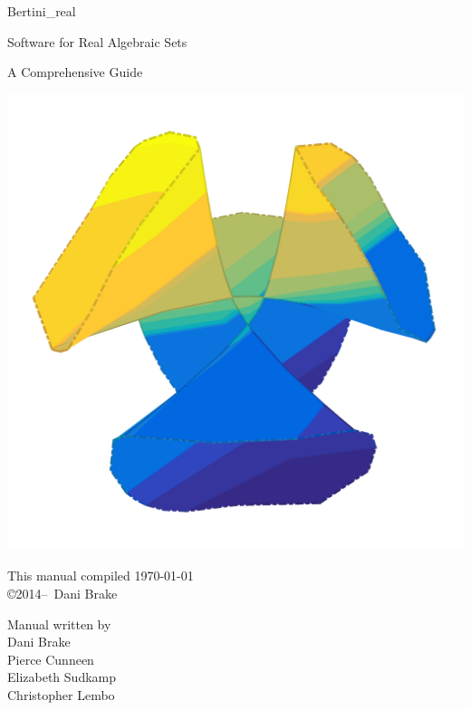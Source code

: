 \documentclass[10pt]{article}
\begin{document}
\pagestyle{plain} 

	\setcounter{page}{1}


\begin{titlepage}

	\begin{center}
	\vspace{2cm}
	{\Large Bertini\_real}

\vspace{\baselineskip}
	{\large Software for Real Algebraic Sets}



	{\large A Comprehensive Guide}	

	\vspace{3cm}
	\includegraphics[width=0.75\linewidth]{CayleyCubic}
	\end{center}

	\vfill

	\begin{minipage}{\linewidth}

	\begin{minipage}{0.4\linewidth}
	\centering
	This manual compiled \today \\
	\copyright 2014--\the\year\ Dani Brake
	\end{minipage}
	\hfill
	\begin{minipage}{0.4\linewidth}
	\centering Manual written by \vspace{\baselineskip}
	\\  Dani Brake \\ Pierce Cunneen \\ Elizabeth Sudkamp \\ Christopher Lembo
	\end{minipage}

	\end{minipage}

	

\end{titlepage}
\end{document}
